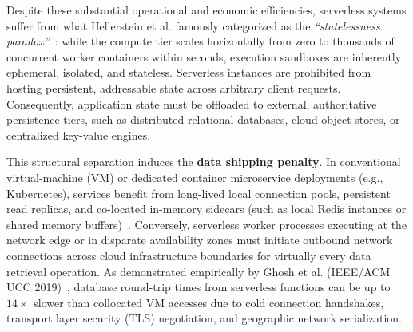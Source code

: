 \documentclass[conference]{IEEEtran}
\begin{document}
Despite these substantial operational and economic efficiencies, serverless systems suffer from what Hellerstein et al. famously categorized as the \textit{``statelessness paradox''}~\cite{hellerstein2019}: while the compute tier scales horizontally from zero to thousands of concurrent worker containers within seconds, execution sandboxes are inherently ephemeral, isolated, and stateless. Serverless instances are prohibited from hosting persistent, addressable state across arbitrary client requests. Consequently, application state must be offloaded to external, authoritative persistence tiers, such as distributed relational databases, cloud object stores, or centralized key-value engines.

This structural separation induces the \textbf{data shipping penalty}. In conventional virtual-machine (VM) or dedicated container microservice deployments (e.g., Kubernetes), services benefit from long-lived local connection pools, persistent read replicas, and co-located in-memory sidecars (such as local Redis instances or shared memory buffers)~\cite{dean2013}. Conversely, serverless worker processes executing at the network edge or in disparate availability zones must initiate outbound network connections across cloud infrastructure boundaries for virtually every data retrieval operation. As demonstrated empirically by Ghosh et al. (IEEE/ACM UCC 2019)~\cite{ghosh2019}, database round-trip times from serverless functions can be up to $14\times$ slower than collocated VM accesses due to cold connection handshakes, transport layer security (TLS) negotiation, and geographic network serialization.
\end{document}
